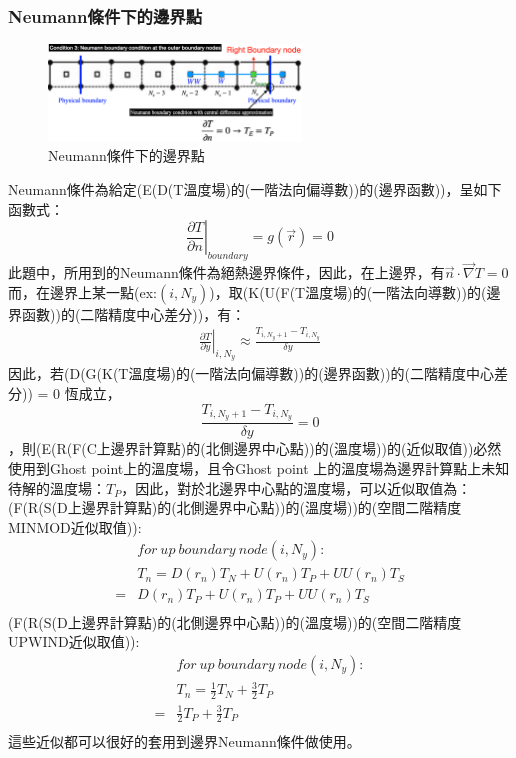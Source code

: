 \documentclass[12pt]{article}
\begin{document}
\subsubsection{Neumann條件下的邊界點}
\begin{figure}[H]
    \centering
    \includegraphics[width=0.6\textwidth]{35.png}
    \caption{\footnotesize Neumann條件下的邊界點}
    \label{fig:Neumann條件下的邊界點}
\end{figure}
\noindent Neumann條件為給定(E(D(T溫度場)的(一階法向偏導數))的(邊界函數))，呈如下函數式：$$\left. \frac{\partial T}{\partial n}\right|_{boundary} = g(\vec{r}) = 0$$ 
\noindent 此題中，所用到的Neumann條件為絕熱邊界條件，因此，在上邊界，有$\vec{n}\cdot \vec{\nabla }T = 0$而，在邊界上某一點(ex:$(i,N_{y})$)，取(K(U(F(T溫度場)的(一階法向導數))的(邊界函數))的(二階精度中心差分))，有：
\begin{equation*}\begin{split}
    \left.\frac{\partial T}{\partial y}\right|_{i,N_{y}} \approx \frac{T_{i,N_{y}+1} - T_{i,N_{y}}}{\delta y}
\end{split}\end{equation*}
\noindent 因此，若(D(G(K(T溫度場)的(一階法向偏導數))的(邊界函數))的(二階精度中心差分)) = 0 恆成立，$$\frac{T_{i,N_{y}+1} - T_{i,N_{y}}}{\delta y} = 0$$，則(E(R(F(C上邊界計算點)的(北側邊界中心點))的(溫度場))的(近似取值))必然使用到Ghost point上的溫度場，且令Ghost point 上的溫度場為邊界計算點上未知待解的溫度場：$T_{P}$，因此，對於北邊界中心點的溫度場，可以近似取值為：\\[1.5ex]
\noindent (F(R(S(D上邊界計算點)的(北側邊界中心點))的(溫度場))的(空間二階精度MINMOD近似取值)):
\begin{equation}\begin{split}
    &for\ up\ boundary\ node (i,N_{y}):\\[1.5ex]
    &T_{n} = D(r_{n})T_{N} + U(r_{n})T_{P} + UU(r_{n})T_{S} \\[1.5ex]
    = &D(r_{n})T_{P} + U(r_{n})T_{P} + UU(r_{n})T_{S} \\[1.5ex]
\end{split}\end{equation}
\noindent (F(R(S(D上邊界計算點)的(北側邊界中心點))的(溫度場))的(空間二階精度UPWIND近似取值)):
\begin{equation}\begin{split}
    &for\ up\ boundary\ node (i,N_{y}):\\[1.5ex]
    &T_{n} = \frac{1}{2}T_{N} + \frac{3}{2}T_{P}  \\[1.5ex]
    =& \frac{1}{2}T_{P} + \frac{3}{2}T_{P}  \\[1.5ex]
\end{split}\end{equation}
\noindent 這些近似都可以很好的套用到邊界Neumann條件做使用。
\end{document}
